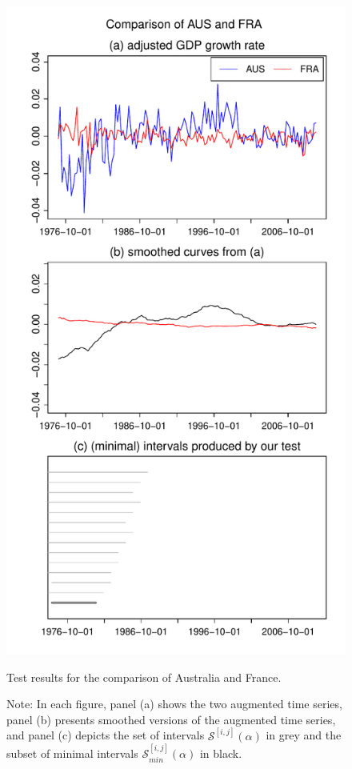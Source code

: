 \documentclass[a4paper,12pt]{article}
\begin{document}
\begin{figure}[p!]
\begin{minipage}[t]{0.49\textwidth}
\includegraphics[width=\textwidth]{output/plots/gdp/AUS_vs_FRA}
\caption{Test results for the comparison of Australia and France.}\label{fig:Australia:France}
\end{minipage}
\caption*{Note: In each figure, panel (a) shows the two augmented time series, panel (b) presents smoothed versions of the augmented time series, and panel (c) depicts the set of intervals $\mathcal{S}^{[i, j]}(\alpha)$ in grey and the subset of minimal intervals $\mathcal{S}^{[i, j]}_{min}(\alpha)$ in black.}
\end{figure}
\end{document}
